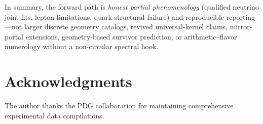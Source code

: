 \documentclass[12pt,a4paper]{article}
\begin{document}
In summary, the forward path is \emph{honest partial phenomenology} (qualified neutrino joint fits, lepton limitations, quark structural failure) and reproducible reporting---not larger discrete geometry catalogs, revived universal-kernel claims, mirror-portal extensions, geometry-based survivor prediction, or arithmetic--flavor numerology without a non-circular spectral hook.

\section*{Acknowledgments}

The author thanks the PDG collaboration for maintaining comprehensive experimental data compilations.



\end{document}
